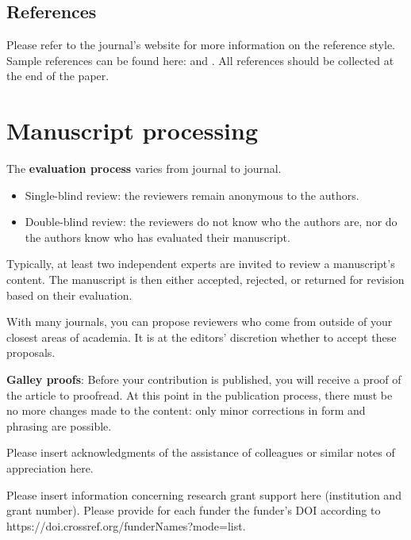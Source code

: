 \documentclass[USenglish,twocolumn]{article}
\theoremstyle{dgthm}
\theoremstyle{dgdef}
\begin{document}
{\subsection{References}
Please refer to the journal's website for more information on the reference style. 
Sample references can be found here: \cite{carbonaro:2008} and \cite{farley:2010,antonyan,chen:2013,hofmann:2013,yong:2001}. All references should be collected at the end of the paper. 

\section{Manuscript processing} 

The \textbf{evaluation process} varies from journal to journal.

\begin{itemize}
    \item Single-blind review: the reviewers remain anonymous to the authors.
    \item Double-blind review: the reviewers do not know who the authors are, nor do the authors know who has evaluated their manuscript.
\end{itemize}
Typically, at least two independent experts are invited to review a manuscript’s content. The manuscript is then either accepted, rejected, or returned for revision based on their evaluation.

With many journals, you can propose reviewers who come from outside of your closest areas of academia. It is at the editors’ discretion whether to accept these proposals.


\textbf{Galley proofs}: Before your contribution is published, you will receive a proof of the article to proofread. At this point in the publication process, there must be no more changes made to the content: only minor corrections in form and phrasing are possible.	
		


\begin{acknowledgement}
  Please insert acknowledgments of the assistance of colleagues or similar notes of appreciation here.
\end{acknowledgement}

\begin{funding}
  Please insert information concerning research grant support here (institution and grant number). Please provide for each funder the funder’s DOI according to https://doi.crossref.org/funderNames?mode=list.
\end{funding}
%
%

}
\end{document}
